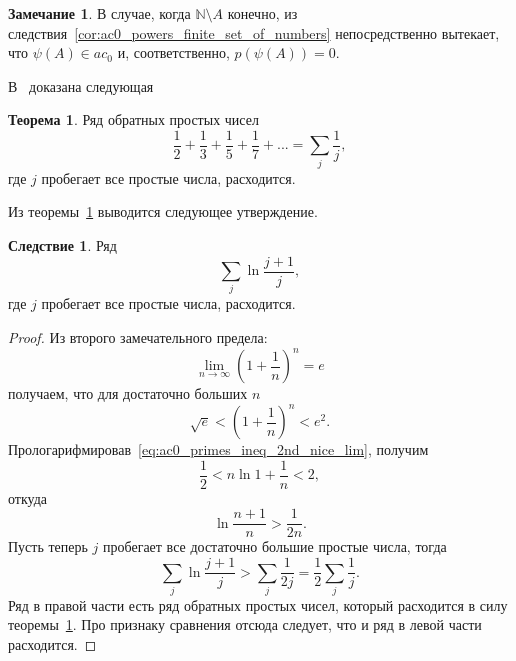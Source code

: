 \documentclass[a4paper,openbib]{article}
\theoremstyle{definition}
\newtheorem{theorem}[lemma]{Теорема}
\newtheorem{remark}[lemma]{Замечание}
\newtheorem{corollary}{Следствие}[lemma]
\begin{document}
\begin{remark}
	В случае, когда $\mathbb{N}\setminus A$ конечно, из следствия~\ref{cor:ac0_powers_finite_set_of_numbers} непосредственно вытекает, что $\psi(A)\in ac_0$
	и, соответственно, $p(\psi(A))=0$.
\end{remark}



В~\cite{euler1737variae} доказана следующая
\begin{theorem}
	\label{thm:Euler_reverse_primes_diverge}
	Ряд обратных простых чисел
	\begin{equation}
		\frac{1}{2} + \frac{1}{3} + \frac{1}{5} + \frac{1}{7} + ...
		=
		\sum_j \frac{1}{j},
	\end{equation}
	где $j$ пробегает все простые числа, расходится.
\end{theorem}

Из теоремы~\ref{thm:Euler_reverse_primes_diverge} выводится следующее утверждение.

\begin{corollary}
	\label{cor:ac0_primes_sum_ln_diverges}
	Ряд
	\begin{equation}
		\sum_j \ln \frac{j+1}{j}
		,
	\end{equation}
	где $j$ пробегает все простые числа, расходится.
\end{corollary}
\begin{proof}
	Из второго замечательного предела:
	\begin{equation}
		\lim_{n\to\infty} \left( 1 + \frac{1}{n} \right)^n = e
	\end{equation}
	получаем, что для достаточно больших $n$
	\begin{equation}
		\label{eq:ac0_primes_ineq_2nd_nice_lim}
		\sqrt{e} < \left( 1 + \frac{1}{n} \right)^n < e^2
		.
	\end{equation}
	Прологарифмировав~\eqref{eq:ac0_primes_ineq_2nd_nice_lim}, получим
	\begin{equation}
		\frac{1}{2} < n \ln  1 + \frac{1}{n} < 2
		,
	\end{equation}
	откуда
	\begin{equation}
		\ln \frac{n+1}{n} > \frac{1}{2n}
		.
	\end{equation}
	Пусть теперь $j$ пробегает все достаточно большие простые числа, тогда
	\begin{equation}
		\sum_j \ln \frac{j+1}{j}  > \sum_j \frac{1}{2j} = \frac{1}{2} \sum_j \frac{1}{j}
		.
	\end{equation}
	Ряд в правой части есть ряд обратных простых чисел, который расходится в силу теоремы~\ref{thm:Euler_reverse_primes_diverge}.
	Про признаку сравнения отсюда следует, что и ряд в левой части расходится.
\end{proof}
\end{document}
